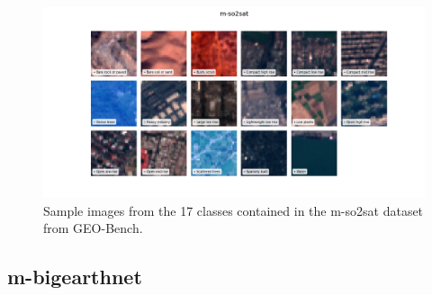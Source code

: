 \documentclass[a4paper, twoside, english]{sapthesis} %
\begin{document}
\begin{figure}[h]
    \centering
    \includegraphics[width=\textwidth]{img/m-so2sat_image_grid.png}
    \caption{\normalsize Sample images from the 17 classes contained in the m-so2sat dataset from GEO-Bench.}
    \label{fig:so2satgrid}
\end{figure}

\newpage

\subsection{m-bigearthnet}
\end{document}
